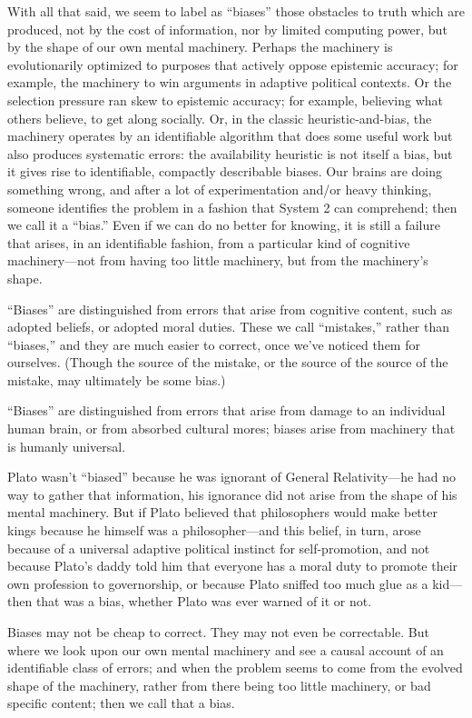{
 With all that said, we seem to label as
``biases'' those obstacles to truth
which are produced, not by the cost of information, nor by limited
computing power, but by the shape of our own mental machinery. Perhaps
the machinery is evolutionarily optimized to purposes that actively
oppose epistemic accuracy; for example, the machinery to win arguments
in adaptive political contexts. Or the selection pressure ran skew to
epistemic accuracy; for example, believing what others believe, to get
along socially. Or, in the classic heuristic-and-bias, the machinery
operates by an identifiable algorithm that does some useful work but
also produces systematic errors: the availability heuristic is not
itself a bias, but it gives rise to identifiable, compactly describable
biases. Our brains are doing something wrong, and after a lot of
experimentation and/or heavy thinking, someone identifies the problem
in a fashion that System 2 can comprehend; then we call it a
``bias.'' Even if we can do no
better for knowing, it is still a failure that arises, in an
identifiable fashion, from a particular kind of cognitive
machinery---not from having too little machinery, but from the
machinery's shape.}

{
 ``Biases'' are distinguished
from errors that arise from cognitive content, such as adopted beliefs,
or adopted moral duties. These we call
``mistakes,'' rather than
``biases,'' and they are much easier
to correct, once we've noticed them for ourselves.
(Though the source of the mistake, or the source of the source of the
mistake, may ultimately be some bias.)}

{
 ``Biases'' are distinguished
from errors that arise from damage to an individual human brain, or
from absorbed cultural mores; biases arise from machinery that is
humanly universal.}

{
 Plato wasn't
``biased'' because he was ignorant
of General Relativity---he had no way to gather that information, his
ignorance did not arise from the shape of his mental machinery. But if
Plato believed that philosophers would make better kings because he
himself was a philosopher---and this belief, in turn, arose because of
a universal adaptive political instinct for self-promotion, and not
because Plato's daddy told him that everyone has a
moral duty to promote their own profession to governorship, or because
Plato sniffed too much glue as a kid---then that was a bias, whether
Plato was ever warned of it or not.}

{
 Biases may not be cheap to correct. They may not even be
correctable. But where we look upon our own mental machinery and see a
causal account of an identifiable class of errors; and when the problem
seems to come from the evolved shape of the machinery, rather from
there being too little machinery, or bad specific content; then we call
that a bias.}

